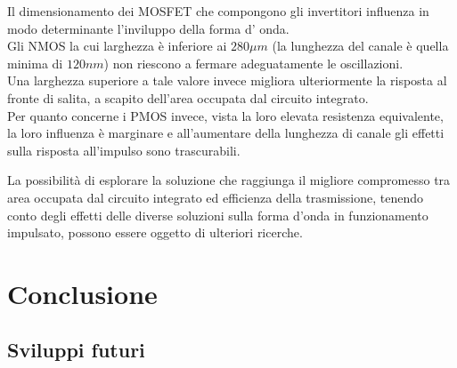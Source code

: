 \documentclass[a4paper, 12pt]{memoir}
\begin{document}
Il dimensionamento dei MOSFET che compongono gli invertitori influenza in modo
determinante l'inviluppo della forma d' onda.\\
Gli NMOS la cui larghezza è inferiore ai $280 \mu m$ (la lunghezza del canale è
quella minima di $120nm$) non riescono a fermare adeguatamente le oscillazioni.
\\Una larghezza superiore a tale valore invece migliora ulteriormente la
risposta al fronte di salita, a scapito dell'area occupata dal circuito
integrato.\\
Per quanto concerne i PMOS invece, vista la loro elevata resistenza
equivalente, la loro influenza è marginare e all'aumentare della lunghezza di
canale gli effetti sulla risposta all'impulso sono trascurabili.

La possibilità di esplorare la soluzione che raggiunga il migliore compromesso
tra area occupata dal circuito integrato ed efficienza della trasmissione,
tenendo conto degli effetti delle diverse soluzioni sulla forma d'onda in
funzionamento impulsato, possono essere oggetto di ulteriori ricerche.

\cleardoublepage{}
\chapter{Conclusione}

\section{Sviluppi futuri}



\end{document}
